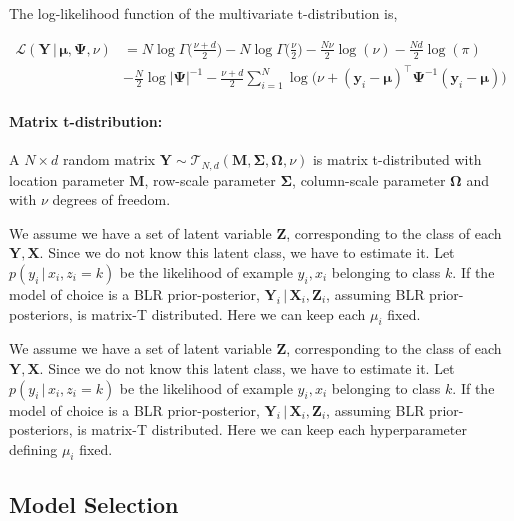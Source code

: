 The log-likelihood function of the multivariate t-distribution is,

\begin{align*}
    \mathcal{L}(\mathbf{Y} \, | \, \bm{\mu}, \mathbf{\Psi}, \nu) &= N \log \Gamma\Big(\frac{\nu + d}{2}\Big) - N \log \Gamma\Big(\frac{\nu}{2}\Big) - \frac{N \nu}{2}\log(\nu) - \frac{Nd}{2}\log(\pi)\\ &- \frac{N}{2}\log |\mathbf{\Psi}|^{-1} - \frac{\nu+d}{2}\sum_{i=1}^N \log\Big(\nu + (\bm{y}_i-\bm{\mu})^\top \mathbf{\Psi}^{-1}(\bm{y}_i-\bm{\mu})\Big)
\end{align*}

\paragraph{Matrix t-distribution:}
A $N \times d$ random matrix $\mathbf{Y} \sim \mathcal{T}_{N, d}(\mathbf{M}, \mathbf{\Sigma}, \mathbf{\Omega}, \nu)$ is matrix t-distributed with location parameter $\mathbf{M}$, row-scale parameter $\mathbf{\Sigma}$, column-scale parameter $\mathbf{\Omega}$ and with $\nu$ degrees of freedom.

\begin{example}
We assume we have a set of latent variable $\mathbf{Z}$, corresponding to the class of each $\mathbf{Y}, \mathbf{X}$. Since we do not know this latent class, we have to estimate it. Let $p(y_i \, | \, x_i, z_i = k)$ be the likelihood of example $y_i, x_i$ belonging to class $k$. If the model of choice is a BLR prior-posterior, $\mathbf{Y}_i \, | \, \mathbf{X}_i, \mathbf{Z}_i$, assuming BLR prior-posteriors, is matrix-T distributed. Here we can keep each $\mu_i$ fixed.
\end{example}

\begin{example}
We assume we have a set of latent variable $\mathbf{Z}$, corresponding to the class of each $\mathbf{Y}, \mathbf{X}$. Since we do not know this latent class, we have to estimate it. Let $p(y_i \, | \, x_i, z_i = k)$ be the likelihood of example $y_i, x_i$ belonging to class $k$. If the model of choice is a BLR prior-posterior, $\mathbf{Y}_i \, | \, \mathbf{X}_i, \mathbf{Z}_i$, assuming BLR prior-posteriors, is matrix-T distributed. Here we can keep each hyperparameter defining $\mu_i$ fixed.
\end{example}


\subsection{Model Selection}

